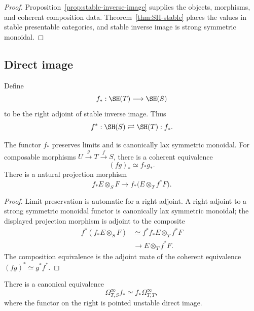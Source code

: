 \begin{proof}
Proposition~\ref{prop:stable-inverse-image} supplies the objects, morphisms, and coherent
composition data.  Theorem~\ref{thm:SH-stable} places the values in stable presentable categories,
and stable inverse image is strong symmetric monoidal.
\end{proof}

\subsection{Direct image}

\begin{definition}
\label{def:stable-direct-image}
Define
\[
    f_*:\SH(T)\longrightarrow\SH(S)
\]
to be the right adjoint of stable inverse image.  Thus
\[
    f^*:\SH(S)
    \rightleftarrows
    \SH(T):f_*.
\]
\end{definition}

\begin{proposition}
\label{prop:stable-direct-image-properties}
The functor $f_*$ preserves limits and is canonically lax symmetric monoidal.  For composable
morphisms $U\xrightarrow{g}T\xrightarrow{f}S$, there is a coherent equivalence
\[
    (fg)_*
    \simeq
    f_*g_*.
\]
There is a natural projection morphism
\[
    f_*E\otimes_SF
    \longrightarrow
    f_*\bigl(E\otimes_Tf^*F\bigr).
\]
\end{proposition}

\begin{proof}
Limit preservation is automatic for a right adjoint.  A right adjoint to a strong symmetric monoidal
functor is canonically lax symmetric monoidal; the displayed projection morphism is adjoint to the
composite
\[
\begin{aligned}
    f^*(f_*E\otimes_SF)
    &\simeq
    f^*f_*E\otimes_Tf^*F \\
    &\longrightarrow
    E\otimes_Tf^*F.
\end{aligned}
\]
The composition equivalence is the adjoint mate of the coherent equivalence
$(fg)^*\simeq g^*f^*$.
\end{proof}

\begin{proposition}
\label{prop:Omega-infty-direct-image}
There is a canonical equivalence
\[
    \Omega_{T,S}^\infty f_*
    \simeq
    f_*\Omega_{T,T}^\infty,
\]
where the functor on the right is pointed unstable direct image.
\end{proposition}

